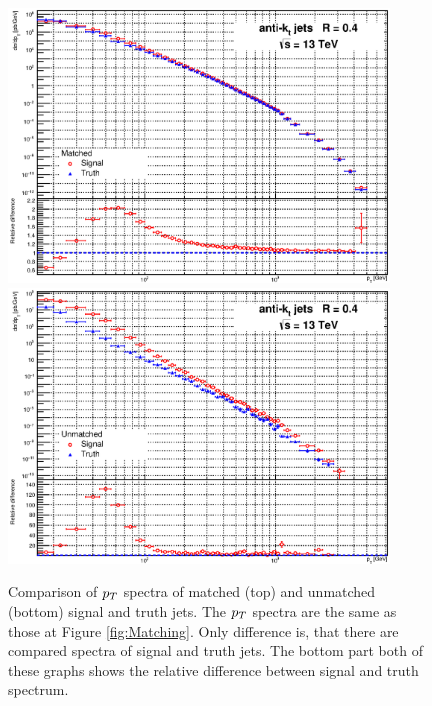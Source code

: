 \begin{appendices}
\begin{figure}[p]
  \centering
  \includegraphics[width=0.9\textwidth]{Chapter3/SignalVSTruthMatched.eps}
  \includegraphics[width=0.9\textwidth]{Chapter3/SignalVSTruthUnmatched.eps}
  \caption{Comparison of $p_{T}$ spectra of matched (top) and unmatched (bottom)
  signal and truth jets. The $p_{T}$ spectra are the same as those at Figure
  \ref{fig:Matching}. Only difference is, that there are compared spectra of
  signal and truth jets.  The bottom part both of these graphs shows the
  relative difference between signal and truth spectrum. }
  \label{fig:MatchedUnmatched}
\end{figure}


\end{appendices}
